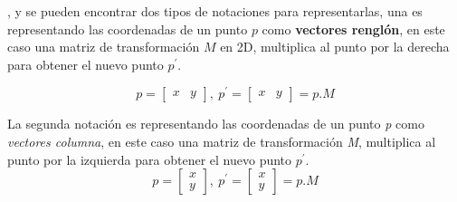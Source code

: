  \citep{Matias2007}, y se pueden encontrar dos tipos de notaciones para representarlas, una es representando las coordenadas de un punto $p$ como \textbf{vectores renglón}, en este caso una matriz de transformación $M$ en 2D, multiplica al punto por la derecha para obtener el nuevo punto $p^\prime$. 

\begin{equation}
   p = \begin{bmatrix}
       x & y         
     \end{bmatrix}, \ p^{\prime} = \begin{bmatrix}
       x & y         
     \end{bmatrix}= p.M  
\end{equation} 
     
La segunda notación es representando las coordenadas de un punto \textit{p} como \textit{vectores columna}, en este caso una matriz de transformación \textit{M}, multiplica al punto por la izquierda para obtener el nuevo punto $p^{\prime}$.
\begin{equation}
     p = \begin{bmatrix}
       x \\ y         
     \end{bmatrix}, \ p^{\prime} = \begin{bmatrix}
       x \\ y           
     \end{bmatrix}= p.M 
\end{equation}
     
